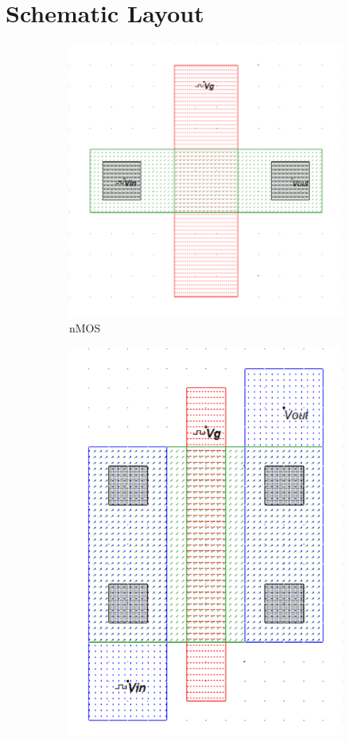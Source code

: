 \documentclass[a4paper,12pt]{article}
\begin{document}
	\section{Schematic Layout }
	\begin{figure}[H]
		\centering
		
		\begin{subfigure}[t]{0.49\textwidth}
			\centering
			\includegraphics[width=1\textwidth , height=.25\textheight]{Images/nmos/nmos1.png}
			\caption{nMOS}
			\label{fig:3-a}
		\end{subfigure}
		\hfill
		\begin{subfigure}[t]{0.49\textwidth}
			\centering
			\includegraphics[width=.7\textwidth, height=0.25\textheight]{Images/Builtin nmos/nmos2.png}

\end{subfigure}
\end{figure}
\end{document}

